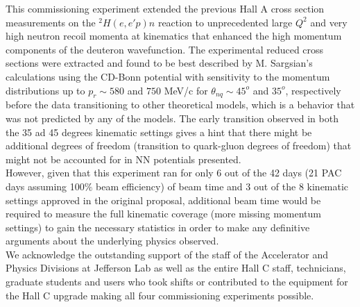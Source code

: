 \indent This commissioning experiment extended the previous Hall A cross section measurements on the $^{2}H(e,e'p)n$ reaction to 
unprecedented large $Q^{2}$ and very high neutron recoil momenta at kinematics that enhanced the high momentum components of the deuteron wavefunction.
The experimental reduced cross sections were extracted and found to be best described by M. Sargsian's calculations using the CD-Bonn potential with sensitivity to the momentum distributions
up to $p_{r}\sim580$ and $750$ MeV/c for $\theta_{nq}\sim45^{o}$ and $35^{o}$, respectively before the data transitioning to other theoretical models, which is a
behavior that was not predicted by any of the models. The early transition observed in both the 35 ad 45 degrees kinematic settings gives a hint that 
there might be additional degrees of freedom (transition to quark-gluon degrees of freedom) that might not be accounted for in NN potentials presented. \\
\indent However, given that this experiment ran for only 6 out of the 42 days (21 PAC days assuming 100$\%$ beam efficiency) of beam time and 3 out of the 8 kinematic settings approved in
the original proposal\cite{e12_10_003_proposal}, additional beam time would be required to measure the full kinematic coverage (more missing momentum settings) to gain the necessary statistics 
in order to make any definitive arguments about the underlying physics observed. \\
\indent We acknowledge the outstanding support of the staff of the Accelerator and Physics Divisions at Jefferson Lab
as well as the entire Hall C staff, technicians, graduate students and users who took shifts or contributed
to the equipment for the Hall C upgrade making all four commissioning experiments possible. 


